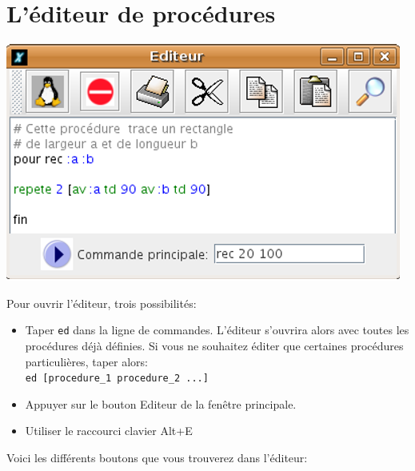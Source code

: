 \section{L'éditeur de procédures}
\begin{center}
 \includegraphics[scale=0.4]{images/CaptureEditeur.png}
\end{center}
Pour ouvrir l'éditeur, trois possibilités:
\begin{itemize}
\item Taper \texttt{ed} dans la ligne de commandes. L'éditeur s'ouvrira alors avec toutes les procédures déjà définies. Si vous ne souhaitez éditer que certaines procédures particulières, taper alors:\\ \texttt{ed [procedure\_1 procedure\_2 ...]}
\item Appuyer sur le bouton Editeur de la fenêtre principale.
\item Utiliser le raccourci clavier Alt+E
\end{itemize} 
\vspace{0.5cm}
Voici les différents boutons que vous trouverez dans l'éditeur:\\

